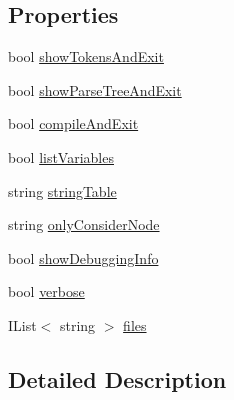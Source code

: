 \subsection*{Properties}
\begin{DoxyCompactItemize}
\item 
bool \hyperlink{a00166_ab1a387df201e3e136c15e5744219628d}{show\-Tokens\-And\-Exit}
\item 
bool \hyperlink{a00166_abef6bf44ae4792d7644b1c02de625208}{show\-Parse\-Tree\-And\-Exit}
\item 
bool \hyperlink{a00166_af9b6917244075618720f2a90bbe6ef56}{compile\-And\-Exit}
\item 
bool \hyperlink{a00166_a062775744f2d7144527fa3bca4b9b3ce}{list\-Variables}
\item 
string \hyperlink{a00079_a7e43c3b73722956cb0f5d507e4eef527}{string\-Table}
\item 
string \hyperlink{a00079_af4c0062a1d46281d377f87084fde374e}{only\-Consider\-Node}
\item 
bool \hyperlink{a00020_a89964ea17bd19caf00cb5bff563ed01c}{show\-Debugging\-Info}
\item 
bool \hyperlink{a00020_ada4d83d1756918f362d55f6649b82b17}{verbose}
\item 
I\-List$<$ string $>$ \hyperlink{a00020_aa93cbb1bc1d5328e0a417012621e92d2}{files}
\end{DoxyCompactItemize}


\subsection{Detailed Description}


